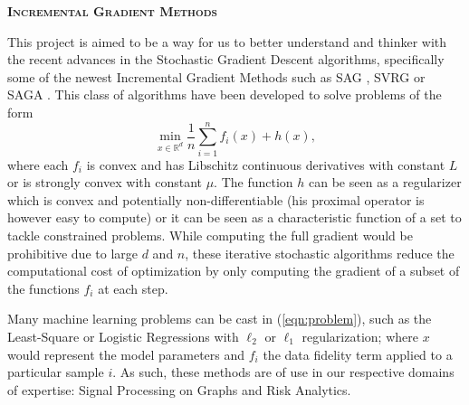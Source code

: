 \documentclass[a4paper,11pt]{article}
\newcommand{\R}{\mathbb{R}}
\newcommand{\eqnref}[1]{(\ref{eqn:#1})}
\begin{document}
\begin{center} 
	\Large{\textbf{\textsc{Incremental Gradient Methods}}}
\end{center}

This project is aimed to be a way for us to better understand and thinker with
the recent advances in the Stochastic Gradient Descent algorithms, specifically
some of the newest Incremental Gradient Methods such as SAG
\cite{schmidt_minimizing_2013}, SVRG \cite{johnson_accelerating_2013} or SAGA
\cite{defazio_saga_2014}. This class of algorithms have been developed to solve
problems of the form
\begin{equation} \label{eqn:problem}
	\min_{x \in \R^d} \frac{1}{n} \sum_{i=1}^n f_i(x) + h(x),
\end{equation}
where each $f_i$ is convex and has Libschitz continuous derivatives with
constant $L$ or is strongly convex with constant $\mu$. The function $h$ can be seen as a regularizer which is convex and potentially non-differentiable (his proximal operator
is however easy to compute) or it can be seen as a characteristic function of a set to tackle constrained problems. While computing the full gradient would be
prohibitive due to large $d$ and $n$, these iterative stochastic algorithms
reduce the computational cost of optimization by only computing the gradient of
a subset of the functions $f_i$ at each step.

Many machine learning problems can be cast in \eqnref{problem}, such as the
Least-Square or Logistic Regressions with $\ell_2$ or $\ell_1$ regularization;
where $x$ would represent the model parameters and $f_i$ the data fidelity term
applied to a particular sample $i$. As such, these methods are of use in our
respective domains of expertise: Signal Processing on Graphs and Risk Analytics.
\end{document}
